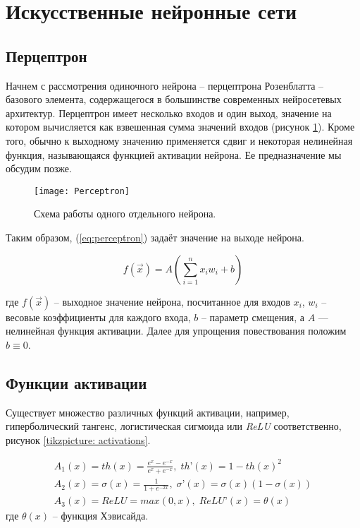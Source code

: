 \section{Искусственные нейронные сети}


\subsection{Перцептрон}

\indent
\indent
Начнем с рассмотрения одиночного нейрона
 -- перцептрона Розенблатта \cite{perceptron} --
 базового элемента, содержащегося в большинстве современных нейросетевых архитектур.
Перцептрон имеет несколько входов и один выход, значение на котором
вычисляется как взвешенная сумма значений входов 
(рисунок \ref{tikzpicture: perceptron}).
Кроме того, обычно
к выходному значению применяется сдвиг и некоторая нелинейная функция, 
называющаяся функцией активации нейрона. Ее предназначение мы обсудим позже.

\begin{figure}[h!]
    \begin{center}
   	    \texttt{[image: Perceptron]}
   	\end{center}
   	\caption{Схема работы одного отдельного нейрона.}
   	\label{tikzpicture: perceptron}
\end{figure}


\indent
\indent
Таким образом, (\ref{eq:perceptron}) задаёт значение на выходе нейрона.

\begin{equation}\label{eq:perceptron}
    f(\vec{x}) = A(\sum_{i=1}^n x_i w_i + b)
\end{equation}


где $f(\vec{x})$ -- выходное значение нейрона, посчитанное для входов $x_i$,
$w_i$ -- весовые коэффициенты для каждого входа, $b$ -- параметр смещения, 
а $A$ --- нелинейная функция активации. Далее для упрощения повествования
положим $b \equiv 0$.

\subsection{Функции активации}

\indent
\indent
Существует множество различных функций активации, например, гиперболический
тангенс, логистическая сигмоида или \textit{ReLU}
соответственно, рисунок \ref{tikzpicture: activations}.

\begin{equation}\label{eq:activations}
	\begin{gathered}
	    A_{1}(x) = th(x) = \frac{e^x - e^{-x}}{e^x + e^{-x}},    \;   th’(x) = {1 - th(x)^2}  \\    
	    A_{2}(x) = \sigma(x) = \frac{1}{1 + e^{-2x}},   \;   \sigma’(x) = \sigma(x)(1 - \sigma(x)) \\
	    A_{3}(x) = ReLU = max(0, x),   \;   ReLU’(x) = \theta(x)
	\end{gathered}
\end{equation}
где $\theta(x)$ -- функция Хэвисайда.

